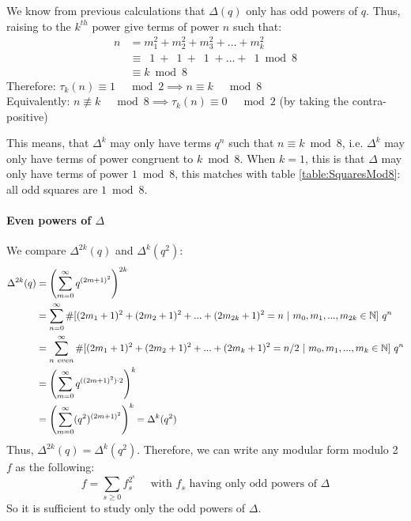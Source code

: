 We know from previous calculations that $\Delta(q)$ only has odd powers of $q$.
Thus, raising to the $k^{th}$ power give terms of power $n$ such that:
\begin{align*}
n &= m_1^2 + m_2^2 + m_3^2 + \dots + m_k^2 \\
&\equiv \:\; 1 \ + \:\; 1 \ + \:\; 1 \; + \dots + \:\; 1 \bmod 8 \\
&\equiv k \bmod 8
\end{align*}
Therefore: $\tau_k(n) \equiv 1 \quad \bmod 2 \implies n \equiv k \quad \bmod 8$\\
Equivalently: $n \not\equiv k \quad \bmod 8 \implies \tau_k(n) \equiv 0 \quad \bmod 2$ (by taking the contra-positive)

This means, that $\Delta^k$ may only have terms $q^n$ such that $n \equiv k \bmod 8$, i.e. $\Delta^k$ may only have terms of power congruent to $k \bmod 8$.
When $k=1$, this is that $\Delta$ may only have terms of power $1 \bmod 8$, this matches with table \ref{table:SquaresMod8}: all odd squares are $1 \bmod 8$.
\label{ObservationsMod8}

\paragraph{Even powers of $\Delta$}
We compare $\Delta^{2k}(q)$ and $\Delta^k(q^2)$:
\begin{align*}
	\Delta^{2k}(q) 
	&= \left( \sum_{m=0}^{\infty} q^{(2m+1)^2} \right)^{2k} \\
	&= \sum_{n=0}^{\infty} \#[ (2m_1+1)^2+(2m_2+1)^2+...+(2m_{2k}+1)^2=n \ | \  m_0,m_1,...,m_{2k} \in \mathbb{N} ] \  q^n\\
	&= \sum_{n \ even}^{\infty} \#[ (2m_1+1)^2+(2m_2+1)^2+...+(2m_k+1)^2=n/2 \ | \  m_0,m_1,...,m_k \in \mathbb{N} ] \  q^n\\
	&= \left( \sum_{m=0}^{\infty} q^{((2m+1)^2) \cdot 2} \right)^k \\
	&= \left( \sum_{m=0}^{\infty} (q^2)^{(2m+1)^2} \right)^k = \Delta^{k}(q^2)
\end{align*}
Thus, $\Delta^{2k}(q) = \Delta^k(q^2)$.
Therefore, we can write any modular form modulo 2 $f$ as the following:
$$
f = \sum_{s \geq 0} f_s^{2^s} \quad \text{ with } f_s \text{ having only odd powers of } \Delta
$$
\cite[(3)]{OrdreNilpotenceOperateurHecke}
So it is sufficient to study only the odd powers of $\Delta$.

